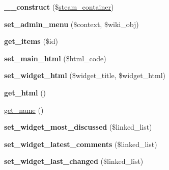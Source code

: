 \begin{DoxyCompactItemize}
\item 
\hypertarget{classlms__wiki_ae4c1b35d6417e2c6d4863924edf1c96e}{
{\bfseries \_\-\_\-construct} (\$\hyperlink{classsteam__container}{steam\_\-container})}
\label{classlms__wiki_ae4c1b35d6417e2c6d4863924edf1c96e}

\item 
\hypertarget{classlms__wiki_a92a73a8f76e17f54852578c0f3e52cc2}{
{\bfseries set\_\-admin\_\-menu} (\$context, \$wiki\_\-obj)}
\label{classlms__wiki_a92a73a8f76e17f54852578c0f3e52cc2}

\item 
\hypertarget{classlms__wiki_ae09d516fc445256da3aa3b649e3ee94e}{
{\bfseries get\_\-items} (\$id)}
\label{classlms__wiki_ae09d516fc445256da3aa3b649e3ee94e}

\item 
\hypertarget{classlms__wiki_a9112c5731c25adaef09b59adc10099ce}{
{\bfseries set\_\-main\_\-html} (\$html\_\-code)}
\label{classlms__wiki_a9112c5731c25adaef09b59adc10099ce}

\item 
\hypertarget{classlms__wiki_a76610f42e9ce13a2c9448da2cae54198}{
{\bfseries set\_\-widget\_\-html} (\$widget\_\-title, \$widget\_\-html)}
\label{classlms__wiki_a76610f42e9ce13a2c9448da2cae54198}

\item 
\hypertarget{classlms__wiki_ad0285dffc4fdaffd7e5279b9819528e7}{
{\bfseries get\_\-html} ()}
\label{classlms__wiki_ad0285dffc4fdaffd7e5279b9819528e7}

\item 
\hyperlink{classlms__wiki_af4f8def169471e208b6a88f7fd8ef514}{get\_\-name} ()
\item 
\hypertarget{classlms__wiki_a6d93d2500f785f3fc3e6bdd5229b482e}{
{\bfseries set\_\-widget\_\-most\_\-discussed} (\$linked\_\-list)}
\label{classlms__wiki_a6d93d2500f785f3fc3e6bdd5229b482e}

\item 
\hypertarget{classlms__wiki_a2901618c4a37a30ad87cd6c266e1f840}{
{\bfseries set\_\-widget\_\-latest\_\-comments} (\$linked\_\-list)}
\label{classlms__wiki_a2901618c4a37a30ad87cd6c266e1f840}

\item 
\hypertarget{classlms__wiki_a6ae566a5159096d1e4c050cdd9570d8b}{
{\bfseries set\_\-widget\_\-last\_\-changed} (\$linked\_\-list)}
\label{classlms__wiki_a6ae566a5159096d1e4c050cdd9570d8b}


\end{DoxyCompactItemize}
